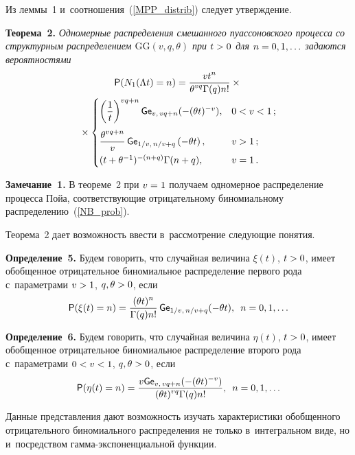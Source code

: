 \begin{multicols}{2}
Из леммы~1 и~соотношения~(\ref{MPP_distrib}) следует 
утверж\-де\-ние.

\smallskip

\noindent
\textbf{Теорема~2.}
\textit{Одномерные распределения смешанного пуассоновского процесса со структурным 
распределением $\mathrm{GG}(v,q,\theta)$
при $t\hm>0$ для $n\hm=0,1,\ldots$ задаются вероятностями}
\begin{multline*}
{\sf P} (N_1(\Lambda t)=n)=
\displaystyle\frac{\displaystyle vt^n\mathstrut}{\displaystyle \theta^{vq}\Gamma(q)n!\mathstrut}\times{}\\
{}\times
 \begin{cases}
   \left(\displaystyle\frac{\displaystyle 1\mathstrut}{\displaystyle t\mathstrut}\right)^{vq+n}{\sf Ge}_{v,\, vq+n}(-(\theta t)^{-v}), &0<v<1\,;\\[12pt]
\displaystyle\frac{\displaystyle \theta^{vq+n}\mathstrut}{\displaystyle v\mathstrut}\,{\sf Ge}_{1/v,\, n/v+q}
\left(-\theta t\right), & v>1\,;\\[3pt]
   (t+\theta^{-1})^{-(n+q)}\Gamma(n+q), & v = 1\,.
 \end{cases}
\end{multline*}



\noindent
\textbf{Замечание~1.}
В теореме~2 при $v\hm=1$ получаем одномерное распределение процесса 
Пойа, соответствующие отрицательному биномиальному распределению~(\ref{NB_prob}).


\smallskip

Теорема~2 дает возможность ввести в~рассмотрение следующие 
понятия.

\smallskip

\noindent
\textbf{Определение~5.}
Будем говорить, что случайная величина $\xi(t)$, $t\hm>0$, имеет обобщенное 
отрицательное биномиальное распределение первого рода с~параметрами $v\hm>1$, 
$q,\theta\hm>0$, если
$$
{\sf P}(\xi(t)=n) =
\displaystyle\frac{\displaystyle (\theta t)^{n}\mathstrut}{\displaystyle \Gamma(q)n!\mathstrut}\,
   {\sf Ge}_{1/v,\, n/v+q}(-\theta t), \enskip n=0,1,\ldots
$$

\smallskip

\noindent
\textbf{Определение~6.}
Будем говорить, что случайная величина $\eta(t)$, $t\hm>0$, имеет обобщенное 
отрицательное биномиальное распределение второго рода с~параметрами $0\hm<v\hm<1$, 
$q,\theta\hm>0$, если
$$
{\sf P}(\eta(t)=n) =
\displaystyle\frac{\displaystyle v{\sf Ge}_{v,\, vq+n}(-(\theta t)^{-v})\mathstrut}{\displaystyle (\theta t)^{vq}\Gamma(q)n!\mathstrut}    , \enskip 
n=0,1,\ldots
$$


Данные представления дают возможность \mbox{изучать} характеристики обобщенного 
отрицательного биномиального распределения не только в~интегральном виде, но 
и~посредством гам\-ма-экс\-по\-нен\-ци\-аль\-ной функции.


\end{multicols}
